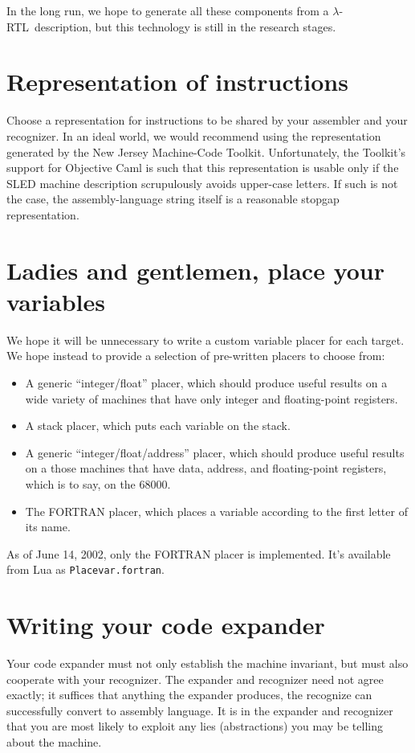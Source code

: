 \documentclass[12pt]{article}
\newcommand\lrtl{\mbox{$\lambda$-RTL}}
\begin{document}
In the long run,
we hope to generate all these components from a \lrtl\ description,
but this technology is still in the research stages.

\section{Representation of instructions}

Choose a representation for instructions to be shared by your
assembler and your recognizer.
In an ideal world, 
we would recommend using the representation generated by the New Jersey
Machine-Code Toolkit. 
Unfortunately, the Toolkit's support for Objective Caml is such that
this representation is usable only if the SLED machine description
scrupulously avoids upper-case letters.
If such is not the case, the assembly-language string itself is a
reasonable stopgap representation.

\section{Ladies and gentlemen, place your variables} 


We hope it will be unnecessary to write a custom variable placer for
each target.
We hope instead to provide a selection of pre-written placers to
choose from:
\begin{itemize}
\item
A generic ``integer/float'' placer, which should produce useful
results on a wide variety of machines that have only integer and
floating-point registers.
\item
A stack placer, which puts each variable on the stack.
\item
A generic ``integer/float/address'' placer, which should produce useful
results on a those machines that have data, address, and 
floating-point registers, which is to say, on the 68000.
\item
The FORTRAN placer, which places a variable according to the first
letter of its name.
\end{itemize}
As of June 14, 2002, only the FORTRAN placer is implemented.
It's available from Lua as \texttt{Placevar.fortran}.

\section{Writing your code expander}

Your code expander must not only establish the machine invariant, but
must also cooperate with your recognizer.
The expander and recognizer need not agree exactly;
it suffices that anything the expander produces, the recognize can
successfully convert to assembly language.
It is in the expander and recognizer that you are most likely to
exploit any lies (abstractions) you may be telling about the machine.
\end{document}
